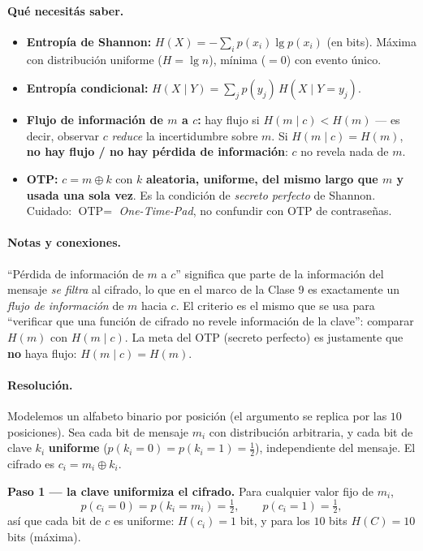 \paragraph{Qué necesitás saber.}
\begin{itemize}
  \item \textbf{Entropía de Shannon:} $H(X) = -\sum_i p(x_i)\lg p(x_i)$ (en bits). Máxima con
        distribución uniforme ($H=\lg n$), mínima ($=0$) con evento único.
  \item \textbf{Entropía condicional:} $H(X\mid Y) = \sum_j p(y_j)\,H(X\mid Y=y_j)$.
  \item \textbf{Flujo de información de $m$ a $c$:} hay flujo si $H(m\mid c) < H(m)$ — es
        decir, observar $c$ \emph{reduce} la incertidumbre sobre $m$. Si $H(m\mid c)=H(m)$,
        \textbf{no hay flujo / no hay pérdida de información}: $c$ no revela nada de $m$.
  \item \textbf{OTP:} $c = m \oplus k$ con $k$ \textbf{aleatoria, uniforme, del mismo largo
        que $m$ y usada una sola vez}. Es la condición de \emph{secreto perfecto} de Shannon.
        Cuidado: $\text{OTP} =$ \emph{One-Time-Pad}, no confundir con OTP de contraseñas.
\end{itemize}

\paragraph{Notas y conexiones.}
``Pérdida de información de $m$ a $c$'' significa que parte de la información del mensaje
\emph{se filtra} al cifrado, lo que en el marco de la Clase 9 es exactamente un \emph{flujo de
información} de $m$ hacia $c$. El criterio es el mismo que se usa para ``verificar que una
función de cifrado no revele información de la clave'': comparar $H(m)$ con $H(m\mid c)$.
La meta del OTP (secreto perfecto) es justamente que \textbf{no} haya flujo: $H(m\mid c)=H(m)$.

\paragraph{Resolución.}
Modelemos un alfabeto binario por posición (el argumento se replica por las $10$ posiciones).
Sea cada bit de mensaje $m_i$ con distribución arbitraria, y cada bit de clave $k_i$
\textbf{uniforme} ($p(k_i{=}0)=p(k_i{=}1)=\tfrac12$), independiente del mensaje. El cifrado es
$c_i = m_i \oplus k_i$.

\medskip
\textbf{Paso 1 — la clave uniformiza el cifrado.} Para cualquier valor fijo de $m_i$,
\begin{equation*}
  p(c_i{=}0) = p(k_i{=}m_i) = \tfrac12, \qquad p(c_i{=}1) = \tfrac12,
\end{equation*}
así que cada bit de $c$ es uniforme: $H(c_i)=1$ bit, y para los $10$ bits
$H(C)=10$ bits (máxima).

